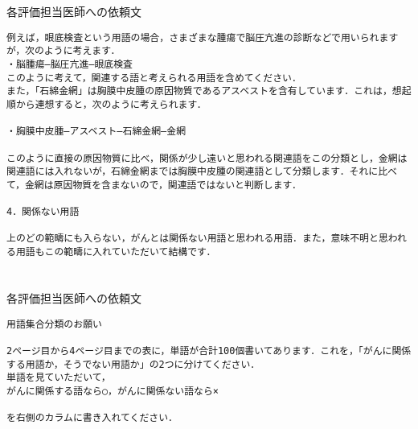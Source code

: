 \documentclass[japanese]{jnlp_1.4}
\begin{document}
\begin{boiteepaisseavecuntitre}{各評価担当医師への依頼文}
\begin{verbatim}
例えば，眼底検査という用語の場合，さまざまな腫瘍で脳圧亢進の診断などで用いられますが，次のように考えます．
・脳腫瘍—脳圧亢進—眼底検査
このように考えて，関連する語と考えられる用語を含めてください．
また，「石綿金網」は胸膜中皮腫の原因物質であるアスベストを含有しています．これは，想起順から連想すると，次のように考えられます．

・胸膜中皮腫—アスベスト—石綿金網—金網

このように直接の原因物質に比べ，関係が少し遠いと思われる関連語をこの分類とし，金網は関連語には入れないが，石綿金網までは胸膜中皮腫の関連語として分類します．それに比べて，金網は原因物質を含まないので，関連語ではないと判断します．

4．関係ない用語

上のどの範疇にも入らない，がんとは関係ない用語と思われる用語．また，意味不明と思われる用語もこの範疇に入れていただいて結構です．
\end{verbatim}
\end{boiteepaisseavecuntitre}

\vspace{3\baselineskip}

\section{}
\begin{boiteepaisseavecuntitre}{各評価担当医師への依頼文}
\begin{verbatim}
用語集合分類のお願い

2ページ目から4ページ目までの表に，単語が合計100個書いてあります．これを，「がんに関係する用語か，そうでない用語か」の2つに分けてください．
単語を見ていただいて，
がんに関係する語なら○，がんに関係ない語なら×

を右側のカラムに書き入れてください．
\end{verbatim}
\end{boiteepaisseavecuntitre}
\end{document}
